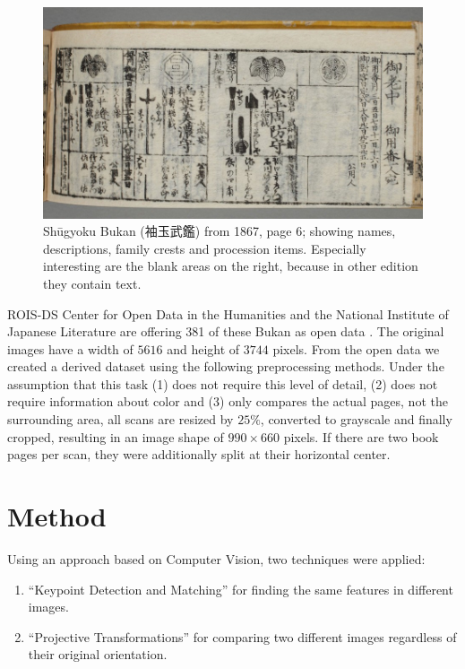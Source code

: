 \documentclass{ltjarticle}
\begin{document}
\begin{figure}
    \centering
    \includegraphics[width=\textwidth]{200019649_00006}
    \caption[Shūgyoku Bukan (袖玉武鑑), page 6]{Shūgyoku Bukan (袖玉武鑑) from 1867, page 6; showing names, descriptions, family crests and procession items. Especially interesting are the blank areas on the right, because in other edition they contain text.}
    \label{fig:shuugyokubukan006}
\end{figure}

ROIS-DS Center for Open Data in the Humanities and the National Institute of Japanese Literature are offering 381 of these Bukan as open data \cite{codh2018bukan}. The original images have a width of $5616$ and height of $3744$ pixels. From the open data we created a derived dataset using the following preprocessing methods. Under the assumption that this task (1) does not require this level of detail, (2) does not require information about color and (3) only compares the actual pages, not the surrounding area, all scans are resized by $25\%$, converted to grayscale and finally cropped, resulting in an image shape of $990 \times 660$ pixels. If there are two book pages per scan, they were additionally split at their horizontal center.

\section{Method}

Using an approach based on Computer Vision, two techniques were applied:

\begin{enumerate}
    \item “Keypoint Detection and Matching” for finding the same features in different images.
    \item “Projective Transformations” for comparing two different images regardless of their original orientation.
\end{enumerate}
\end{document}
